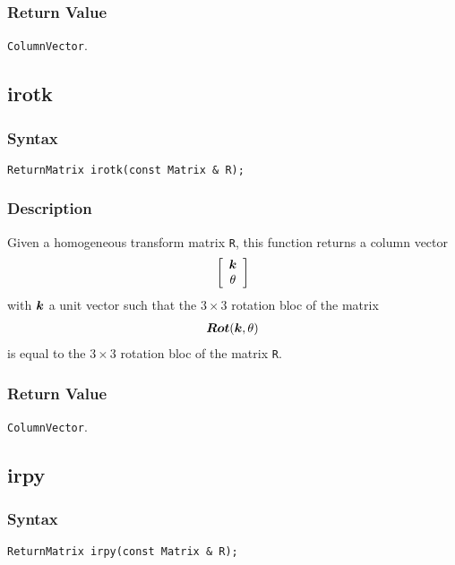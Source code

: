 \documentclass[dvips,11pt,fleqn]{report}
\newcommand{\mbold}[1]{\mbox{\boldmath $ #1 $}}
\newcommand{\matr}[2]{\left[\begin{array}{#1} #2 \end{array}\right]}
\begin{document}

\subsubsection*{Return Value}

{\tt ColumnVector}.

\newpage

\subsection*{irotk}
\subsubsection*{Syntax}
\begin{verbatim}
ReturnMatrix irotk(const Matrix & R);
\end{verbatim}
\subsubsection*{Description}
Given a homogeneous transform matrix {\tt R}, this function returns a column vector
\begin{eqnarray}
\matr{c}{\mbold{k} \\ \theta}
\end{eqnarray}
with $\mbold{k}$ a unit vector such that the $3 \times 3$ rotation bloc of the matrix
\begin{eqnarray}
\mbold{Rot}(\mbold{k}, \theta)
\end{eqnarray}
is equal to the $3 \times 3$ rotation bloc of the matrix {\tt R}.


\subsubsection*{Return Value}

{\tt ColumnVector}.

\newpage

\subsection*{irpy}
\subsubsection*{Syntax}
\begin{verbatim}
ReturnMatrix irpy(const Matrix & R);
\end{verbatim}
\end{document}
